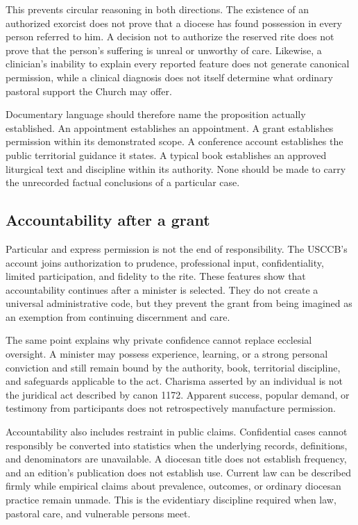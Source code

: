 This prevents circular reasoning in both directions. The existence of an
authorized exorcist does not prove that a diocese has found possession in every
person referred to him. A decision not to authorize the reserved rite does not
prove that the person's suffering is unreal or unworthy of care. Likewise, a
clinician's inability to explain every reported feature does not generate
canonical permission, while a clinical diagnosis does not itself determine
what ordinary pastoral support the Church may offer.

Documentary language should therefore name the proposition actually
established. An appointment establishes an appointment. A grant establishes
permission within its demonstrated scope. A conference account establishes
the public territorial guidance it states. A typical book establishes an
approved liturgical text and discipline within its authority. None should be
made to carry the unrecorded factual conclusions of a particular case.

\subsection{Accountability after a grant}

Particular and express permission is not the end of responsibility. The
USCCB's account joins authorization to prudence, professional input,
confidentiality, limited participation, and fidelity to the rite. These
features show that accountability continues after a minister is selected.
They do not create a universal administrative code, but they prevent the grant
from being imagined as an exemption from continuing discernment and care.

The same point explains why private confidence cannot replace ecclesial
oversight. A minister may possess experience, learning, or a strong personal
conviction and still remain bound by the authority, book, territorial
discipline, and safeguards applicable to the act. Charisma asserted by an
individual is not the juridical act described by canon 1172. Apparent success,
popular demand, or testimony from participants does not retrospectively
manufacture permission.

Accountability also includes restraint in public claims. Confidential cases
cannot responsibly be converted into statistics when the underlying records,
definitions, and denominators are unavailable. A diocesan title does not
establish frequency, and an edition's publication does not establish use.
Current law can be described firmly while empirical claims about prevalence,
outcomes, or ordinary diocesan practice remain unmade. This is the evidentiary
discipline required when law, pastoral care, and vulnerable persons meet.

